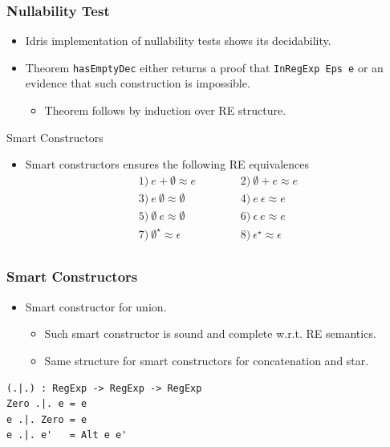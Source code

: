 \documentclass[14pt]{beamer}
\begin{document}
     \begin{frame}
        \frametitle{Nullability Test}
        \begin{itemize}
           \item Idris implementation of nullability tests shows its decidability.
           \item Theorem \texttt{hasEmptyDec} either returns a proof that
           \texttt{InRegExp Eps e} or an evidence that such construction is
           impossible.
           \begin{itemize}
             \item Theorem follows by induction over RE structure.
           \end{itemize}
        \end{itemize}
     \end{frame}
     \begin{frame}{Smart Constructors}
        \begin{itemize}
           \item Smart constructors ensures the following RE equivalences
           \[
           \begin{array}{lcl}
              1)\: e + \emptyset \approx e &\hspace{1cm} & 2)\: \emptyset + e \approx e\\
              3)\: e\:\emptyset \approx \emptyset & \hspace{1cm} & 4)\: e\:\epsilon \approx e\\
              5)\: \emptyset\:e\approx \emptyset & & 6)\: \epsilon\: e \approx e\\
              7)\: \emptyset^\star \approx \epsilon & \hspace{1cm} & 8)\: \epsilon^\star
                                                 \approx \epsilon \\
          \end{array} \]
        \end{itemize}
     \end{frame}
     \begin{frame}[fragile=singleslide]
        \frametitle{Smart Constructors}
        \begin{itemize}
           \item Smart constructor for union.
           \begin{itemize}
             \item Such smart constructor is sound and complete w.r.t.
                   RE semantics.
             \item Same structure for smart constructors for concatenation and
                   star.
           \end{itemize}
        \end{itemize}
        \begin{verbatim}
(.|.) : RegExp -> RegExp -> RegExp
Zero .|. e = e
e .|. Zero = e
e .|. e'   = Alt e e'
        \end{verbatim}
     \end{frame}
\end{document}
